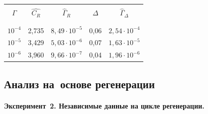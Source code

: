 \begin{table}[b]\small %


\vspace*{-12pt}


\begin{center}




\vspace*{2ex}





\begin{tabular}{|c|c|c|c|c|}


\hline


&&&&\\[-9pt]


$\Gamma$& $\hat{C_R}$ &  ${\hat\Gamma}_{R}$  & $\Delta$ & 


${\hat\Gamma}_{\Delta}$ \\ 


&&&&\\[-9pt] 


\hline


&&&&\\[-9pt]


 $10^{-4}$  & 2,735 & $8{,}49\cdot 10^{-5} $&  0,06 & $2{,}54 \cdot 10^{-4}$  \\




 $10^{-5}$ & 3,429  & $5{,}03 \cdot 10^{-6} $&  0,07 & $1{,}63 \cdot 10^{-5} $\\




 $10^{-6}$ &3,960  &$ 9{,}66 \cdot 10^{-7}$ &  0,04 & $1{,}96 \cdot 10^{-6}$  \\


\hline


\end{tabular}


\end{center}


\end{table}





\subsection{Анализ на~основе регенерации}





\paragraph*{Эксперимент~2. Независимые данные на  цикле регенерации.}


